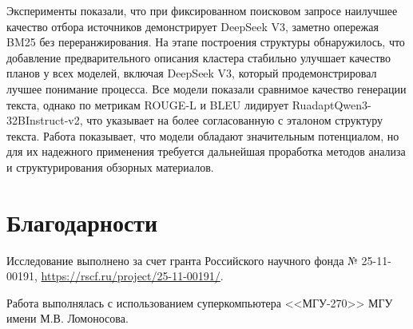 \documentclass{article}
\begin{document}
Эксперименты показали, что при фиксированном поисковом запросе наилучшее качество отбора источников демонстрирует DeepSeek V3, 
заметно опережая BM25 без переранжирования.
На этапе построения структуры обнаружилось, что добавление предварительного описания кластера стабильно улучшает качество планов у всех моделей, включая DeepSeek V3, который продемонстрировал лучшее понимание процесса.
Все модели показали сравнимое качество генерации текста, однако по метрикам ROUGE-L и BLEU лидирует RuadaptQwen3-\allowbreak 32BInstruct-v2, что указывает на более согласованную с эталоном структуру текста.
Работа показывает, что модели обладают значительным потенциалом, 
но для их надежного применения требуется дальнейшая проработка методов анализа и структурирования обзорных материалов.

\section*{Благодарности}
Исследование выполнено за счет гранта Российского научного фонда № 25-11-00191, \url{https://rscf.ru/project/25-11-00191/}.

Работа выполнялась с использованием суперкомпьютера <<МГУ-270>> МГУ имени М.В. Ломоносова.
\end{document}
